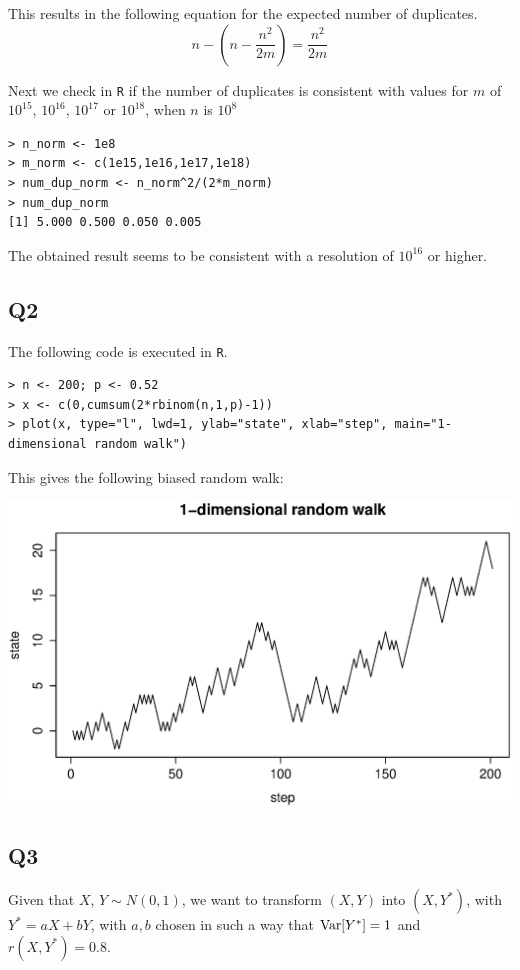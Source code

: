 This results in the following equation for the expected number of duplicates.
\begin{equation}
n - \left(n - \frac{n^2}{2m}\right) = \frac{n^2}{2m}
\end{equation}

Next we check in \verb|R| if the number of duplicates is consistent with values for $m$ of $10^{15}$, $10^{16}$, $10^{17}$ or $10^{18}$, when $n$ is $10^8$
\begin{verbatim}
> n_norm <- 1e8
> m_norm <- c(1e15,1e16,1e17,1e18)
> num_dup_norm <- n_norm^2/(2*m_norm)
> num_dup_norm
[1] 5.000 0.500 0.050 0.005
\end{verbatim}

The obtained result seems to be consistent with a resolution of $10^{16}$ or higher.
 
\subsection*{Q2}
The following code is executed in \verb|R|.
\begin{verbatim}
> n <- 200; p <- 0.52
> x <- c(0,cumsum(2*rbinom(n,1,p)-1))
> plot(x, type="l", lwd=1, ylab="state", xlab="step", main="1-dimensional random walk")
\end{verbatim}
This gives the following biased random walk:

\includegraphics[scale=.6]{NL1_Q2_1D-randomwalk.eps} 

\subsection*{Q3}

Given that $X$, $Y \sim N(0,1)$, we want to transform $(X, Y)$ into $(X, Y^*)$, with $Y^* = aX + bY$, with $a, b$ chosen in such a way that $\operatorname{\text{Var}}[Y^*] = 1$ and $r(X, Y^*) = 0.8$.

